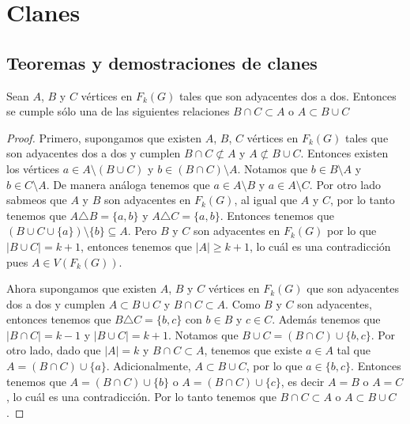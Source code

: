 \chapter{Clanes}%
\label{cap:clanes}

\section{Teoremas y demostraciones de clanes}%
\label{sec:etiquetas}


\begin{lema}%
        \label{lem:K3}
        Sean $A$, $B$ y $C$ v\'ertices en $F_k(G)$ tales que son adyacentes dos
        a dos. Entonces se cumple s\'olo una de las siguientes relaciones $B
        \cap C \subset A$ o $A \subset B \cup C$
        \end{lema}

    
    \begin{proof}
        Primero, supongamos que existen $A$, $B$, $C$ v\'ertices en $F_k(G)$
        tales que son adyacentes dos a dos y cumplen $B \cap C \not\subset A$ y
        $A \not\subset B \cup C$. Entonces existen los v\'ertices  $a \in A
        \setminus (B \cup C)$ y $b \in (B \cap C)\setminus A$. Notamos que $b
        \in B \setminus A$ y $b \in C \setminus A$. De manera an\'aloga tenemos
        que $a \in A \setminus B$ y $a \in A \setminus C$. Por otro lado sabmeos
        que $A$ y $B$ son adyacentes en $F_k(G)$, al igual que $A$ y $C$, por lo
        tanto tenemos que $A \triangle B = \{a,b\}$ y $A \triangle C = \{a,
        b\}$. Entonces tenemos que $(B \cup C \cup \{a\})\setminus \{b\}
        \subseteq A$. Pero $B$ y $C$ son adyacentes en $F_k(G)$ por lo que $|B
        \cup C| = k+1$, entonces tenemos que $|A| \geq k+1$, lo cu\'al es una
        contradicci\'on pues $A \in V (F_k(G))$. 

        Ahora supongamos que existen $A$, $B$ y $C$ v\'ertices en $F_k(G)$ que
        son adyacentes dos a dos y cumplen $A \subset B \cup C$ y $B \cap C
        \subset A$. Como $B$ y $C$ son adyacentes, entonces tenemos que $B
        \triangle C = \{b,c\}$ con $b \in B$ y $c \in C$. Adem\'as tenemos que
        $|B \cap C| = k-1$ y $|B \cup C| = k +1$. Notamos que $B \cup C = (B\cap
        C) \cup \{b,c\}$. Por otro lado, dado que $|A|=k$ y $B \cap C \subset
        A$, tenemos que existe $a \in A$ tal que $A = (B \cap C) \cup \{a\}$.
        Adicionalmente, $A \subset B \cup C$, por lo que $a \in \{b, c\}$.
        Entonces tenemos que $A = (B \cap C) \cup \{b\}$ o $A = (B \cap C) \cup
        \{c\}$, es decir $A = B$ o $A=C$, lo cu\'al es una contradicci\'on. Por
        lo tanto tenemos que $B \cap C \subset A$ o $A \subset B \cup C$.
    \end{proof}

